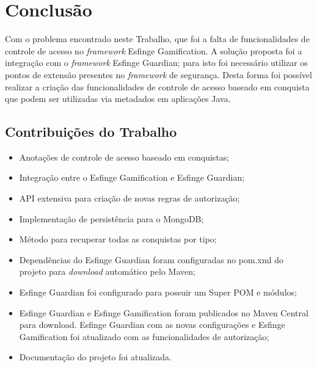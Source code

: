 \newpage
\chapter{Conclus\~ao}
\par Com o problema encontrado neste Trabalho, que foi a falta de funcionalidades de controle de acesso no \textit{framework} Esfinge Gamification. A solução proposta foi a integração com o \textit{framework} Esfinge Guardian; para isto foi necessário utilizar os pontos de extensão presentes no \textit{framework} de segurança. Desta forma foi possível realizar a criação das funcionalidades de controle de acesso baseado em conquista que podem ser utilizadas via metadados em aplicações Java.

\section{Contribuições do Trabalho}

\begin{itemize}
    \item Anotações de controle de acesso baseado em conquistas;
    \item Integração entre o Esfinge Gamification e Esfinge Guardian;
    \item API extensiva para criação de novas regras de autorização;
    \item Implementação de persistência para o MongoDB;
    \item Método para recuperar todas as conquistas por tipo;
    \item Dependências do Esfinge Guardian foram configuradas no pom.xml do projeto para \textit{download} automático pelo Maven;
    \item Esfinge Guardian foi configurado para possuir um Super POM e módulos;
    \item Esfinge Guardian e Esfinge Gamification foram publicados no Maven Central para download. Esfinge Guardian com as novas configurações e Esfinge Gamification foi atualizado com as funcionalidades de autorização;
    \item Documentação do projeto foi atualizada.
    \end{itemize}


